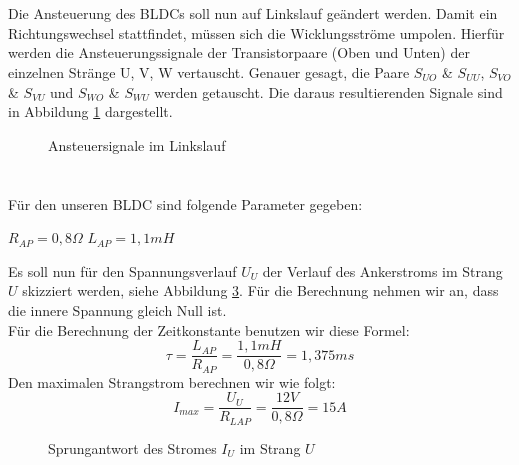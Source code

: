 \section{}\label{sec:2c}
Die Ansteuerung des BLDCs soll nun auf Linkslauf geändert werden. Damit ein Richtungswechsel stattfindet, müssen sich die Wicklungsströme umpolen. Hierfür werden die Ansteuerungssignale der Transistorpaare (Oben und Unten) der einzelnen Stränge U, V, W vertauscht. Genauer gesagt, die Paare $ S_{UO} $ \& $ S_{UU} $, $ S_{VO} $ \& $ S_{VU} $ und $ S_{WO} $ \& $ S_{WU} $ werden getauscht. Die daraus resultierenden Signale sind in Abbildung \ref{fig:2b:links} dargestellt.
\begin{figure}[h]
	\centering
	
	\caption{Ansteuersignale im Linkslauf}
	\label{fig:2b:links}
\end{figure}

\section{}\label{sec:2d}
Für den unseren BLDC sind folgende Parameter gegeben:
\begin{center}
	 $ R_{AP} = 0,8\Omega $ \hspace{2cm} $ L_{AP} = 1,1mH$\\
\end{center}
Es soll nun für den Spannungsverlauf $ U_{U} $ der Verlauf des Ankerstroms im Strang $ U $ skizziert werden, siehe Abbildung \ref{fig:2d:strom}. Für die Berechnung nehmen wir an, dass die innere Spannung gleich Null ist.\\
Für die Berechnung der Zeitkonstante benutzen wir diese Formel:\\
\begin{equation}
	\tau = \frac{L_{AP}}{R_{AP}} = \frac{1,1mH}{0,8\Omega} = 1,375ms
\end{equation}
Den maximalen Strangstrom berechnen wir wie folgt:
\begin{equation}
	I_{max} = \frac{U_{U}}{R_{LAP}} = \frac{12V}{0,8\Omega} = 15A
\end{equation}
\begin{figure}[t]
	\centering
	\begin{subfigure}[Spannung im Strang $ U $]
		{}
	\end{subfigure}
	\begin{subfigure}[Stromverlauf im Strang $ U $]
		{}
		\label{fig:2d:strom}
	\end{subfigure}
	\caption{Sprungantwort des Stromes $ I_{U} $ im Strang $ U $}
\end{figure}



\clearpage

